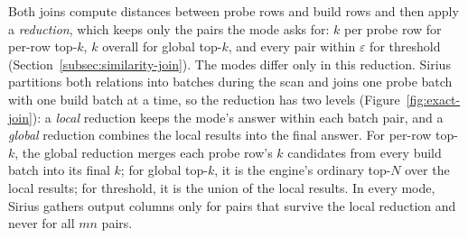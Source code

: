 


Both joins compute distances between probe rows and build rows and then apply a \emph{reduction}, which keeps only the pairs the mode asks for: $k$ per probe row for per-row top-$k$, $k$ overall for global top-$k$, and every pair within $\varepsilon$ for threshold (Section~\ref{subsec:similarity-join}).
The modes differ only in this reduction.
Sirius partitions both relations into batches during the scan and joins one probe batch with one build batch at a time, so the reduction has two levels (Figure~\ref{fig:exact-join}): a \emph{local} reduction keeps the mode's answer within each batch pair, and a \emph{global} reduction combines the local results into the final answer.
For per-row top-$k$, the global reduction merges each probe row's $k$ candidates from every build batch into its final $k$; for global top-$k$, it is the engine's ordinary top-$N$ over the local results; for threshold, it is the union of the local results.
In every mode, Sirius gathers output columns only for pairs that survive the local reduction and never for all $mn$ pairs.

